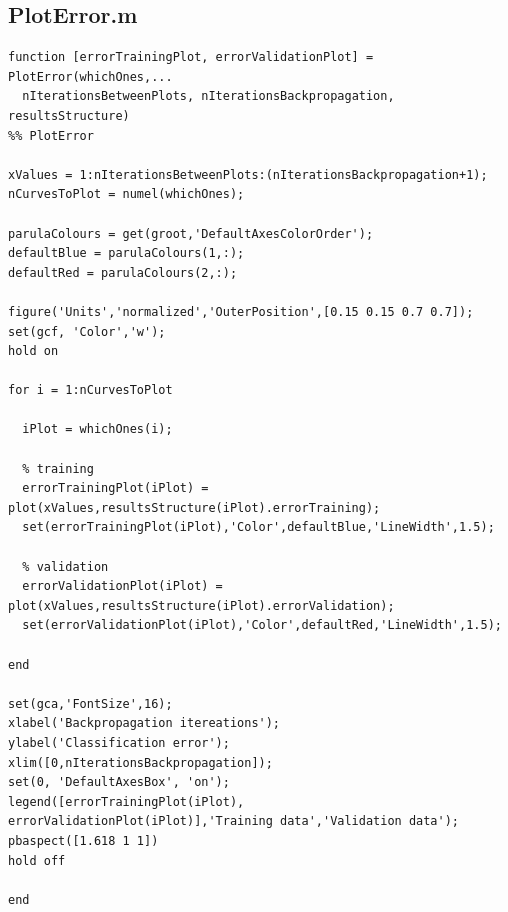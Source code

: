 \documentclass[12pt,titlepage]{article}
\begin{document}
\subsection*{PlotError.m}
\begin{lstlisting}
function [errorTrainingPlot, errorValidationPlot] = PlotError(whichOnes,...
  nIterationsBetweenPlots, nIterationsBackpropagation, resultsStructure)
%% PlotError

xValues = 1:nIterationsBetweenPlots:(nIterationsBackpropagation+1);
nCurvesToPlot = numel(whichOnes);

parulaColours = get(groot,'DefaultAxesColorOrder');
defaultBlue = parulaColours(1,:);
defaultRed = parulaColours(2,:);

figure('Units','normalized','OuterPosition',[0.15 0.15 0.7 0.7]);
set(gcf, 'Color','w');
hold on

for i = 1:nCurvesToPlot
    
  iPlot = whichOnes(i);
  
  % training
  errorTrainingPlot(iPlot) = plot(xValues,resultsStructure(iPlot).errorTraining);
  set(errorTrainingPlot(iPlot),'Color',defaultBlue,'LineWidth',1.5);
  
  % validation
  errorValidationPlot(iPlot) = plot(xValues,resultsStructure(iPlot).errorValidation);
  set(errorValidationPlot(iPlot),'Color',defaultRed,'LineWidth',1.5);
  
end

set(gca,'FontSize',16);
xlabel('Backpropagation itereations');
ylabel('Classification error');
xlim([0,nIterationsBackpropagation]);
set(0, 'DefaultAxesBox', 'on');
legend([errorTrainingPlot(iPlot), errorValidationPlot(iPlot)],'Training data','Validation data');
pbaspect([1.618 1 1])
hold off

end
\end{lstlisting}
\end{document}
